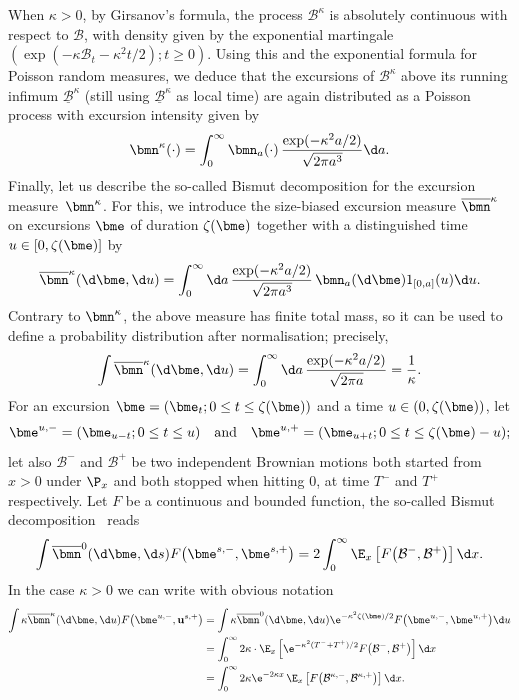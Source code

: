 When $\kappa\!>\!0$, by Girsanov's formula, the process $\mathcal{B}^\kappa$ is absolutely continuous with respect to $\mathcal{B}$, with density given by the exponential martingale \hbox{$(\exp(-\kappa \mathcal{B}_t \!-\! \kappa^2t/2) ; t \!\!\ge\! 0)$}. Using this and the exponential formula for Poisson random measures, we deduce that the excursions of $\mathcal{B}^{\kappa}$ above its running infimum $\underline{\mathcal{B}}^{\kappa}$ (still using $\underline{\mathcal{B}}^{\kappa}$ as local time) are again distributed as a Poisson process with excursion intensity given by
\[
\bmn^{\kappa}(\cdot) = \int_0^\infty \bmn_a(\cdot)\, \frac{\exp(-\kappa^2 a/2)}{\sqrt{2\pi a^3}} \d a.
\]
Finally, let us describe the so-called Bismut decomposition for the excursion measure~$\bmn^{\kappa}$. For this, we introduce the size-biased excursion measure $\overline{\bmn}^{\kappa}$ on excursions $\bme$ of duration $\zeta(\bme)$ together with a distinguished time $u \in [0, \zeta(\bme)]$ by
\begin{equation}\label{eq:excursion_biaisee}
\overline{\bmn}^{\kappa}(\d \bme, \d u) = \int_0^\infty \d a\, \frac{\exp(-\kappa^2 a/2)}{\sqrt{2\pi a^3}}\, \bmn_a(\d \bme) 1_{[0,a]}(u) \d u.
\end{equation}
Contrary to $\bmn^{\kappa}$, the above measure has finite total mass, so it can be used to define a probability distribution after normalisation; precisely,
\[
\int \overline{\bmn}^{\kappa}(\d \bme, \d u) = \int_0^\infty \d a\, \frac{\exp(-\kappa^2 a/2)}{\sqrt{2\pi a}} = \frac{1}{\kappa}.
\]
For an excursion $\bme=(\bme_t ; 0 \le t \le \zeta(\bme))$ and a time $u \in (0, \zeta(\bme))$, let
\[
\bme^{u,-} = (\bme_{u-t} ; 0\le t \le u)\quad\text{and}\quad \bme^{u,+} = (\bme_{u+t} ; 0\le t \le \zeta(\bme)-u);
\]
let also $\mathcal{B}^-$ and $\mathcal{B}^+$ be two independent Brownian motions both started from $x>0$ under $\P_x$ and both stopped when hitting $0$, at time $T^-$ and $T^+$ respectively. Let $F$ be a continuous and bounded function, the so-called Bismut decomposition~\cite[Th.\,4.7, Chap.\,XII, p.\,502]{RY99} reads
\[
\int \overline{\bmn}^{0}(\d \bme, \d s) F\big(\bme^{s,-}, \bme^{s,+}\big)
= 2 \int_0^\infty \E_x\left[F\big(\mathcal{B}^-, \mathcal{B}^+\big)\right] \d x.
\]
In the case $\kappa >0$ we can write with obvious notation
\begin{align*}
\int \kappa \overline{\bmn}^{\kappa}(\d \bme, \d u) F\big(\bme^{u,-}, \mathbf{u}^{s,+}\big)
&= \int \kappa \overline{\bmn}^{0} (\d \bme, \d u) \e^{-\kappa^2\zeta(\bme)/2} F \big(\bme^{u,-}, \bme^{u,+}\big) \d u
\\
&= \int_0^\infty 2\kappa \cdot \E_x\left[\e^{-\kappa^2 (T^-+T^+)/2} F\big(\mathcal{B}^-, \mathcal{B}^+\big)\right] \d x
\\
&= \int_0^\infty 2\kappa \e^{-2 \kappa x} \, \E_x\left[F\big(\mathcal{B}^{\kappa,-}, \mathcal{B}^{\kappa,+}\big)\right] \d x.
\end{align*}

